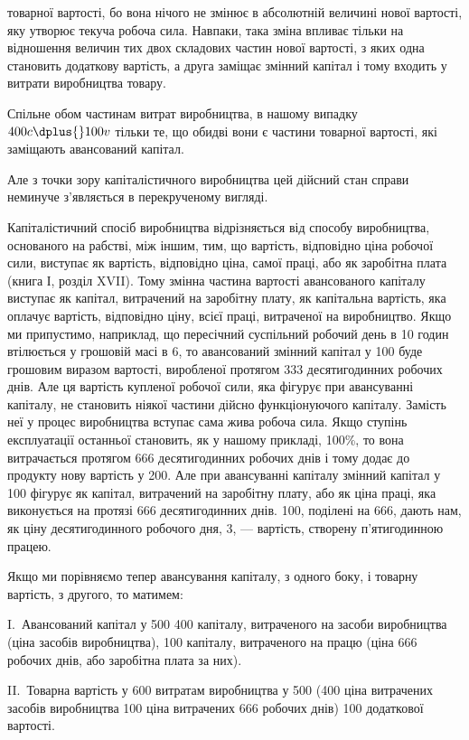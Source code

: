 \parcont{}  %
товарної вартості, бо вона нічого не змінює в абсолютній величині
нової вартості, яку утворює текуча робоча сила. Навпаки,
така зміна впливає тільки на відношення величин тих двох складових
частин нової вартості, з яких одна становить додаткову
вартість, а друга заміщає змінний капітал і тому входить у витрати
виробництва товару.

Спільне обом частинам витрат виробництва, в нашому випадку
$400 c \dplus{} 100v$ тільки те, що обидві вони є частини товарної
вартості, які заміщають авансований капітал.

Але з точки зору капіталістичного виробництва цей дійсний
стан справи неминуче з’являється в перекрученому вигляді.

Капіталістичний спосіб виробництва відрізняється від способу
виробництва, основаного на рабстві, між іншим, тим, що
вартість, відповідно ціна робочої сили, виступає як вартість,
відповідно ціна, самої праці, або як заробітна плата (книга І,
розділ XVII). Тому змінна частина вартості авансованого капіталу
виступає як капітал, витрачений на заробітну плату,
як капітальна вартість, яка оплачує вартість, відповідно ціну,
всієї праці, витраченої на виробництво. Якщо ми припустимо,
наприклад, що пересічний суспільний робочий день в 10 годин
втілюється у грошовій масі в 6, то авансований
змінний капітал у 100 буде грошовим
виразом вартості, виробленої протягом 333 десятигодинних
робочих днів. Але ця вартість купленої робочої сили, яка фігурує
при авансуванні капіталу, не становить ніякої частини
дійсно функціонуючого капіталу. Замість неї у процес виробництва
вступає сама жива робоча сила. Якщо ступінь експлуатації
останньої становить, як у нашому прикладі, 100\%, то вона
витрачається протягом 666 десятигодинних робочих днів і тому
додає до продукту нову вартість у 200. Але
при авансуванні капіталу змінний капітал у 100
фігурує як капітал, витрачений на заробітну плату, або як
ціна праці, яка виконується на протязі 666  десятигодинних
днів. 100, поділені на 666, дають нам, як
ціну десятигодинного робочого дня, 3, — вартість, створену
п’ятигодинною працею.

Якщо ми порівняємо тепер авансування капіталу, з одного
боку, і товарну вартість, з другого, то матимем:

I.~Авансований капітал у 500 \deq{} 400 капіталу, витраченого на засоби виробництва
(ціна засобів виробництва), \dplus{} 100 капіталу,
витраченого на працю (ціна 666 робочих днів, або заробітна
плата за них).

II.~Товарна вартість у 600 \deq{} витратам виробництва
у 500 (400
ціна витрачених засобів виробництва \dplus{} 100
ціна витрачених 666 робочих днів) \dplus{} 100 додаткової вартості.
